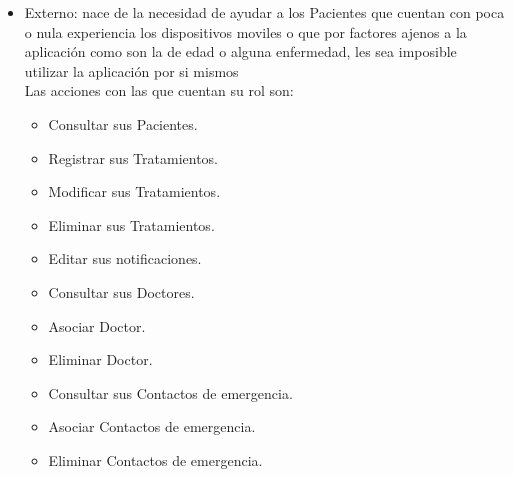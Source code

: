 \begin{itemize}
	\item Externo: nace de la necesidad de ayudar a los Pacientes que cuentan con poca o nula experiencia los dispositivos moviles o que por factores ajenos a la aplicación como son la de edad o alguna enfermedad, les sea imposible utilizar la aplicación por si mismos\\
	Las acciones con las que cuentan su rol son:
	\begin{itemize}
		\item Consultar sus Pacientes.
		\item Registrar sus Tratamientos.
		\item Modificar sus Tratamientos.
		\item Eliminar sus Tratamientos.
		\item Editar sus notificaciones.
		\item Consultar sus Doctores.
		\item Asociar Doctor.
		\item Eliminar Doctor.
		\item Consultar sus Contactos de emergencia.
		\item Asociar Contactos de emergencia.
		\item Eliminar Contactos de emergencia.
%		
	\end{itemize}
\end{itemize}


